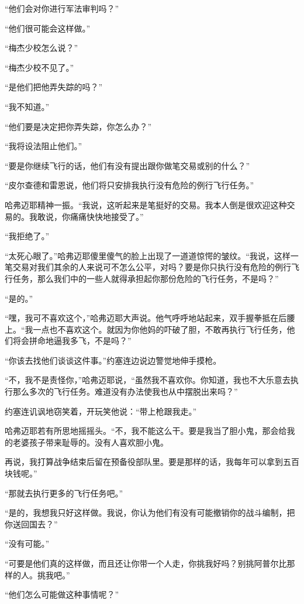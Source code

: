     “他们会对你进行军法审判吗？”

    “他们很可能会这样做。”

    “梅杰少校怎么说？”

    “梅杰少校不见了。”

    “是他们把他弄失踪的吗？”

    “我不知道。”

    “他们要是决定把你弄失踪，你怎么办？”

    “我将设法阻止他们。”

    “要是你继续飞行的话，他们有没有提出跟你做笔交易或别的什么？”

    “皮尔查德和雷恩说，他们将只安排我执行没有危险的例行飞行任务。”

    哈弗迈耶精神一振。“我说，这听起来是笔挺好的交易。我本人倒是很欢迎这种交易的。我敢说，你痛痛快快地接受了。”

    “我拒绝了。”

    “太死心眼了。”哈弗迈耶傻里傻气的脸上出现了一道道惊愕的皱纹。“我说，这样一笔交易对我们其余的人来说可不怎么公平，对吗？要是你只执行没有危险的例行飞行任务，那么我们中的一些人就得承担起你那份危险的飞行任务，不是吗？”

    “是的。”

    “嘿，我可不喜欢这个，”哈弗迈耶大声说。他气呼呼地站起来，双手握拳抵在后腰上。“我一点也不喜欢这个。就因为你他妈的吓破了胆，不敢再执行飞行任务，他们将会拼命地逼我多飞，不是吗？”

    “你该去找他们谈谈这件事。”约塞连边说边警觉地伸手摸枪。

    “不，我不是责怪你，”哈弗迈耶说，“虽然我不喜欢你。你知道，我也不大乐意去执行那么多次的飞行任务。难道没有办法使我也从中摆脱出来吗？”

    约塞连讥讽地窃笑着，开玩笑他说：“带上枪跟我走。”

    哈弗迈耶若有所思地摇摇头。“不，我不能这么干。要是我当了胆小鬼，那会给我的老婆孩子带来耻辱的。没有人喜欢胆小鬼。

    再说，我打算战争结束后留在预备役部队里。要是那样的话，我每年可以拿到五百块钱呢。”

    “那就去执行更多的飞行任务吧。”

    “是的，我想我只好这样做。我说，你认为他们有没有可能撤销你的战斗编制，把你送回国去？”

    “没有可能。”

    “可要是他们真的这样做，而且还让你带一个人走，你挑我好吗？别挑阿普尔比那样的人。挑我吧。”

    “他们怎么可能做这种事情呢？”


